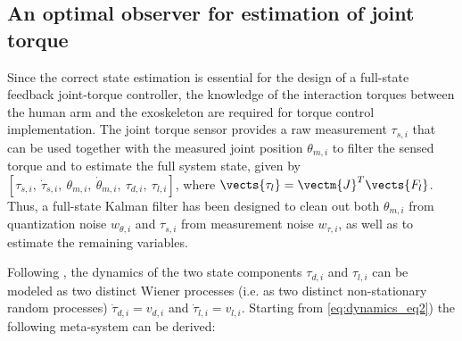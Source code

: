 \subsection{An optimal observer for estimation of joint torque}\label{subsec:kalmanTorque}
Since the correct state estimation  is essential for the design of a full-state feedback joint-torque controller, the knowledge of the interaction torques between the human arm and the exoskeleton are required for  torque control implementation. The joint torque sensor provides a raw measurement $\tau_{s,i}$ that can be used together with the measured joint position $\theta_{m,i}$ to filter the sensed torque and to estimate the full system state, given by $[\tau_{s,i},\ \dot{\tau}_{s,i},\ \theta_{m,i},\ \dot{\theta}_{m,i},\ \tau_{d,i},\ \tau_{l,i}]$, where $\vects{\tau_l}=\vectm{J}^T \vects{F_l}$. 
Thus, a full-state Kalman filter has been designed to clean out both  $\theta_{m,i}$ from quantization noise $w_{\theta,i}$ and $\tau_{s,i}$ from measurement noise $w_{\tau,i}$, as well as to estimate the remaining variables.
%
\par 
Following \cite{vertechy2012interaction}, the dynamics of the two state components $\tau_{d,i}$ and $\tau_{l,i}$ can be modeled as two distinct Wiener processes (i.e. as two distinct non-stationary random processes) $\dot{\tau}_{d,i}=v_{d,i}$ and $\dot{\tau}_{l,i}=v_{l,i}$. Starting from \DIFdelbegin {}\DIFdelend \DIFaddbegin {}\DIFaddend \ref{eq:dynamics_eq2}) the following meta-system can be derived:



